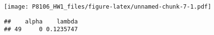 \documentclass[]{article}
\newenvironment{Shaded}{\begin{snugshade}}{\end{snugshade}}
\newcommand{\KeywordTok}[1]{\textcolor[rgb]{0.13,0.29,0.53}{\textbf{#1}}}
\newcommand{\NormalTok}[1]{#1}
\newcommand{\OperatorTok}[1]{\textcolor[rgb]{0.81,0.36,0.00}{\textbf{#1}}}
\begin{document}
\texttt{[image: P8106\_HW1\_files/figure-latex/unnamed-chunk-7-1.pdf]}

\begin{Shaded}
\end{Shaded}

\begin{verbatim}
##    alpha    lambda
## 49     0 0.1235747
\end{verbatim}

\begin{Shaded}
\end{Shaded}
\end{document}
